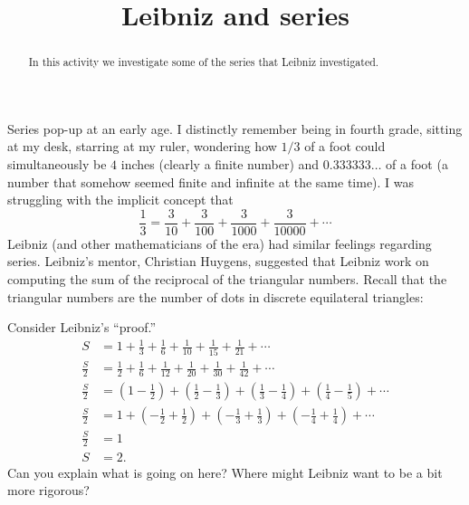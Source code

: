 \documentclass{ximera}
\title{Leibniz and series}
\begin{document}
\begin{abstract}
In this activity we investigate some of the series that Leibniz
investigated.
\end{abstract}
\maketitle


Series pop-up at an early age. I distinctly remember being in fourth
grade, sitting at my desk, starring at my ruler, wondering how $1/3$ of
a foot could simultaneously be $4$ inches (clearly a finite number) and
$0.333333\dots$ of a foot (a number that somehow seemed finite and
infinite at the same time). I was struggling with the implicit concept that 
\[
\frac{1}{3} = \frac{3}{10}+\frac{3}{100}+\frac{3}{1000}+\frac{3}{10000}+\cdots
\]
Leibniz (and other mathematicians of the era) had similar feelings regarding series. Leibniz's mentor, Christian Huygens, suggested that Leibniz work on computing the sum of the reciprocal of the triangular numbers. Recall that the triangular numbers are the number of dots in discrete equilateral triangles:
\begin{image}
\newlength\radius
\pgfmathsetlength{\radius}{0.2cm}
\newcommand\drawballs[2][]{%
    \foreach \y [evaluate=\y as \yy using #2+1-\y] in {1,...,#2} {%
        \foreach \x in {1,...,\yy} {%
            \shade[shading=ball,ball color=white,#1] 
                ({(2*\x-2+\y)*\radius},{sqrt(3)*\y*\radius}) circle (\radius); 
        };
    }%
}
\end{image}

\begin{question}
Consider Leibniz's ``proof.''
\begin{align*}
S &= 1+ \frac{1}{3} + \frac{1}{6} + \frac{1}{10} + \frac{1}{15} + \frac{1}{21} + \cdots\\
\frac{S}{2}&=\frac{1}{2} + \frac{1}{6} + \frac{1}{12} + \frac{1}{20} + \frac{1}{30}+\frac{1}{42} + \cdots\\
\frac{S}{2}&=\left(1-\frac{1}{2}\right) + \left(\frac{1}{2}-\frac{1}{3}\right) + \left(\frac{1}{3}-\frac{1}{4}\right) + \left(\frac{1}{4}-\frac{1}{5}\right) + \cdots\\
\frac{S}{2}&=1+\left(-\frac{1}{2} + \frac{1}{2}\right)+\left(-\frac{1}{3} + \frac{1}{3}\right)+\left(-\frac{1}{4} + \frac{1}{4}\right)+ \cdots\\
\frac{S}{2}&= 1\\
S &= 2.
\end{align*}
Can you explain what is going on here? Where might Leibniz want to be a bit more rigorous?
\end{question}
\end{document}
